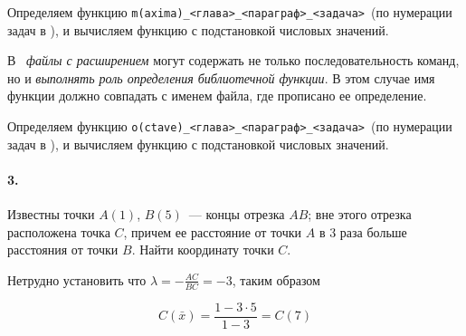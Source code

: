 
Определяем функцию \verb|m(axima)_<глава>_<параграф>_<задача>|\ (по нумерации
задач в \cite{danko}), и вычисляем функцию с подстановкой числовых значений.


В \octave\ \emph{файлы с расширением } могут содержать не только
последовательность команд, но и \emph{выполнять роль определения библиотечной
функции}. В этом случае имя функции должно совпадать с именем файла, где
прописано ее определение.



Определяем функцию \verb|o(ctave)_<глава>_<параграф>_<задача>|\ (по нумерации
задач в \cite{danko}), и вычисляем функцию с подстановкой числовых значений.


\paragraph{3.} Известны точки $A(1)$, $B(5)$\ --- концы отрезка $AB$; вне этого
отрезка расположена точка $C$, причем ее расстояние от точки $A$ в 3 раза больше
расстояния от точки $B$. Найти координату точки $C$.

Нетрудно установить что $\lambda = -\frac{AC}{BC} = -3$, таким образом

\begin{equation}
C(\bar x) = \frac{1-3 \cdot 5}{1-3} = C(7) 
\end{equation}



\secup



\secup
